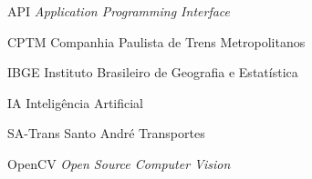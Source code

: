 \begin{siglas}
    \item[API] \textit{Application Programming Interface}
	\item[CPTM] {Companhia Paulista de Trens Metropolitanos}
	\item[IBGE] {Instituto Brasileiro de Geografia e Estatística}
	\item[IA]  {Inteligência Artificial}
	\item[SA-Trans] {Santo André Transportes}
	\item[OpenCV] \textit{Open Source Computer Vision}

\end{siglas}
